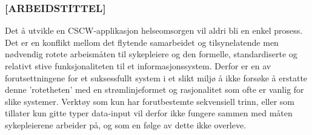 \subsubsection{[ARBEIDSTITTEL]}
Det å utvikle en CSCW-applikasjon helseomsorgen vil aldri bli en enkel prosess. Det er en konflikt mellom det flytende samarbeidet og tilsynelatende men nødvendig rotete arbeismåten til sykepleiere og den formelle, standardiserte og relativt stive funksjonaliteten til et informasjonssystem. Derfor er en av forutsettningene for et suksessfullt system i et slikt miljø å ikke forsøke å erstatte denne 'rotetheten' med en strømlinjeformet og rasjonalitet som ofte er vanlig for slike systemer. Verktøy som kun har forutbestemte sekvensiell trinn, eller som tillater kun gitte typer data-input vil derfor ikke fungere sammen med måten sykepleierene arbeider på, og som en følge av dette ikke overleve.\cite{Berg99}

\noindent
